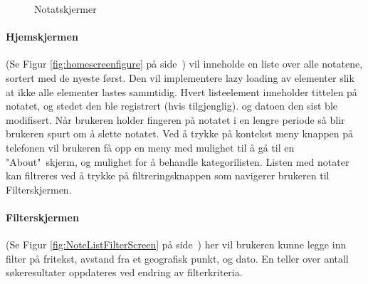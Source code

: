 \documentclass[a4paper, 12pt]{article}
\begin{document}
\begin{figure}[hb]
{		\label{fig:NoteEditPageScreen}}
		\quad
	\caption{Notatskjermer}
\label{fig:notescreens}
\end{figure}


\paragraph{Hjemskjermen} (Se Figur \ref{fig:homescreenfigure} på side~\pageref{fig:homescreenfigure}) vil inneholde en liste over alle notatene, sortert med de nyeste først. Den vil implementere lazy loading av elementer slik at ikke alle elementer lastes sammtidig. Hvert listeelement inneholder tittelen på notatet, og stedet den ble registrert (hvis tilgjenglig). og datoen den sist ble modifisert. Når brukeren holder fingeren på notatet i en lengre periode så blir brukeren spurt om å slette notatet. Ved å trykke på kontekst meny knappen på telefonen vil brukeren få opp en meny med mulighet til å gå til en "About"~skjerm, og mulighet for å behandle kategorilisten. Listen med notater kan filtreres ved å trykke på filtreringsknappen som navigerer brukeren til Filterskjermen.

\paragraph{Filterskjermen} (Se Figur \ref{fig:NoteListFilterScreen} på side~\pageref{fig:NoteListFilterScreen}) her vil brukeren kunne legge inn filter på fritekst, avstand fra et geografisk punkt, og dato. En teller over antall søkeresultater oppdateres ved endring av filterkriteria.
\end{document}
